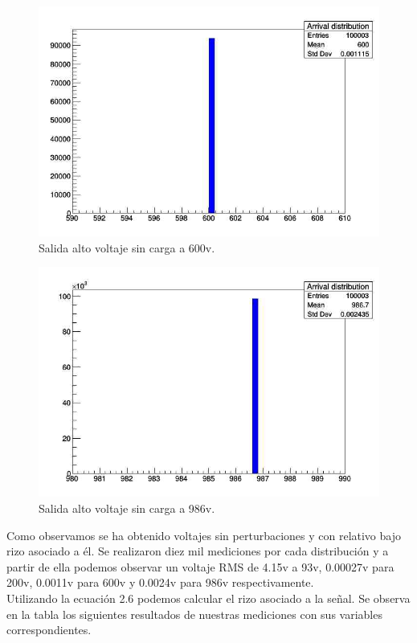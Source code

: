 \begin{figure}[H]
\centering
\includegraphics[width=12cm]{Capitulo4/600v.jpg}
\caption{Salida alto voltaje sin carga a 600v.}
\end{figure}

\begin{figure}[H]
\centering
\includegraphics[width=12cm]{Capitulo4/986v.jpg}
\caption{Salida alto voltaje sin carga a 986v.}
\end{figure}
\newpage

Como observamos se ha obtenido voltajes sin perturbaciones y con relativo bajo rizo asociado a él. Se realizaron diez mil mediciones por cada distribución y a partir de ella podemos observar un voltaje RMS de 4.15v a 93v, 0.00027v para 200v, 0.0011v para 600v y 0.0024v para 986v respectivamente. \\

Utilizando la ecuación 2.6 podemos calcular el rizo asociado a la señal. Se observa en la tabla los siguientes resultados de nuestras mediciones con sus variables correspondientes. 

